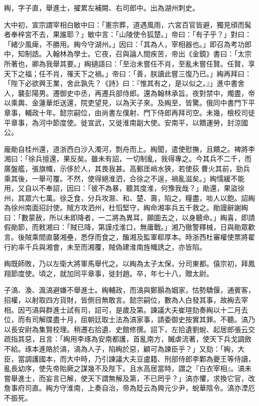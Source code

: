 \begin{pinyinscope}
 綯，字子直，舉進士，擢累左補闕、右司郎中。出為湖州刺史。



 大中初，宣宗謂宰相白敏中曰：「憲宗葬，道遇風雨，六宮百官皆避，獨見頎而髯者奉梓宮不去，果誰耶？」敏中言：「山陵使令狐楚。」帝曰：「有子乎？」對曰：「緒少風痺，不勝用。綯今守湖州。」因曰：「其為人，宰相器也。」即召為考功郎中，知制誥。入翰林為學士。它夜，召與論人間疾苦，帝出《金鏡》書曰：「太宗所著也，卿為我舉其要。」綯擿語曰：「至治未嘗任不肖，至亂未嘗任賢。任賢，享天下之福；任不肖，罹天下之禍。」帝曰：「善，朕讀此嘗三復乃已。」綯再拜曰：「陛下必欲興王業，舍此孰先？《詩》曰：『惟其有之，是以似之。』」進中書舍人，襲彭陽男。遷御史中丞，再遷兵部侍郎。還為翰林承旨。夜對禁中，燭盡，帝以乘輿、金蓮華炬送還，院吏望見，以為天子來。及綯至，皆驚。俄同中書門下平章事，輔政十年。懿宗嗣位，由尚書左僕射、門下侍郎再拜司空。未幾，檢校司徒平章事，為河中節度使。徙宣武，又徙淮南副大使。安南平，以饋運勞，封涼國公。



 龐勛自桂州還，道浙西白沙入濁河，剽舟而上。綯聞，遣使慰撫，且饋之。裨將李湘曰：「徐兵擅還，果反矣。雖未有詔，一切制亂，我得專之。今其兵不二千，而廣盤艦，張旗幟，示侈於人，其畏我甚。高郵厓峭水狹，若使荻曹火其前，勁兵乘其後，一舉可覆。不然，使得絕淮泗，合徐之不逞，禍亂滋矣。」綯懦緩不能用，又自以不奉詔，因曰：「彼不為暴，聽其度淮，何豫我哉？」勛還，果盜徐州，其眾六七萬。徐乏食，分兵攻滁、和、楚、壽，陷之，糧盡，啖人以飽。詔綯為徐州南面招討使。賊方攻泗州，杜慆堅守，綯命湘率兵五千救之。勛謾辭謝綯曰：「數蒙赦，所以未即降者，一二將為異耳，願圖去之，以身聽命。」綯喜，即請假勛節，而敕湘曰：「賊已降，第謹戍淮口，無庸戰。」湘乃徹警釋械，日與勛眾歡言。後賊乘間直襲湘壘，悉俘而食之，醢湘及監軍郗厚本。時浙西杜審權使票將翟行約率千兵與湘會，未至而湘覆，賊偽建淮南旌幟誘之，亦皆陷。



 綯既師敗，乃以左衛大將軍馬舉代之。以綯為太子太保，分司東都。僖宗初，拜鳳翔節度使。頃之，就加同平章事，徙封趙。卒，年七十八，贈太尉。



 子滈、渙、渢滈避嫌不舉進士。綯輔政，而滈與鄭顥為姻家，怙勢驕偃，通賓客，招權，以射取四方貨財，皆側目無敢言。懿宗嗣位，數為人白發其事，故綯去宰相。因丐滈與群進士試有司，詔可，是歲及第。諫議大夫崔瑄劾奏綯以十二月去位，而有司解牒盡十月，屈朝廷取士法為滈家事，請委御史按實其罪。不聽。滈乃以長安尉為集賢校理。稍遷右拾遺、史館修撰。詔下，左拾遺劉蛻、起居郎張云交疏指其惡，且言：「綯用李琢為安南都護，首亂南方，贓虐流著，使天下兵戈調斂不給。琢本進賂於滈，滈為人子，陷綯於惡，顧可為諫臣乎？」又劾：「綯，大臣，當調護國本，而大中時，乃引諫議大夫豆盧籍、刑部侍郎李鄴為夔王等侍讀，亂長幼序，使先帝貽厥之謀幾不及陛下。且水高居當時，謂之『白衣宰相』。滈未嘗舉進士，而妄言已解，使天下謂無解及第，不已罔乎？」滈亦懼，求換它官，改詹事府司直。綯方守淮南，上奏自治，帝為貶云為興元少尹，蛻華陰令。滈亦湮厄不振死。




\end{pinyinscope}
